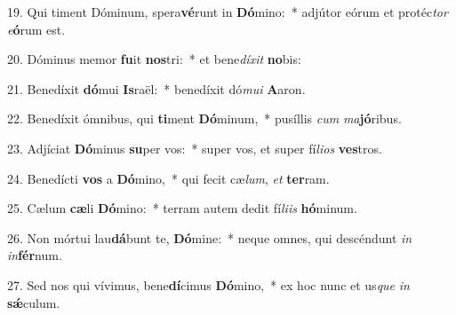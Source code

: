 19. Qui timent Dóminum, spera\textbf{vé}runt in \textbf{Dó}mino:~*  adjútor eórum et protéc\textit{tor} \textit{e}\textbf{ó}rum est.\

20. Dóminus memor \textbf{fu}it \textbf{nos}tri:~*  et bene\textit{dí}\textit{xit} \textbf{no}bis:\

21. Benedíxit \textbf{dó}mui \textbf{Is}raël:~*  benedíxit dó\textit{mu}\textit{i} \textbf{A}aron.\

22. Benedíxit ómnibus, qui \textbf{ti}ment \textbf{Dó}minum,~*  pusíllis \textit{cum} \textit{ma}\textbf{jó}ribus.\

23. Adjíciat \textbf{Dó}minus \textbf{su}per vos:~*  super vos, et super fí\textit{li}\textit{os} \textbf{ves}tros.\

24. Benedícti \textbf{vos} a \textbf{Dó}mino,~*  qui fecit cæ\textit{lum}, \textit{et} \textbf{ter}ram.\

25. Cælum \textbf{cæ}li \textbf{Dó}mino:~*  terram autem dedit fí\textit{li}\textit{is} \textbf{hó}minum.\

26. Non mórtui lau\textbf{dá}bunt te, \textbf{Dó}mine:~*  neque omnes, qui descéndunt \textit{in} \textit{in}\textbf{fér}num.\

27. Sed nos qui vívimus, bene\textbf{dí}cimus \textbf{Dó}mino,~*  ex hoc nunc et us\textit{que} \textit{in} \textbf{sǽ}culum.\

